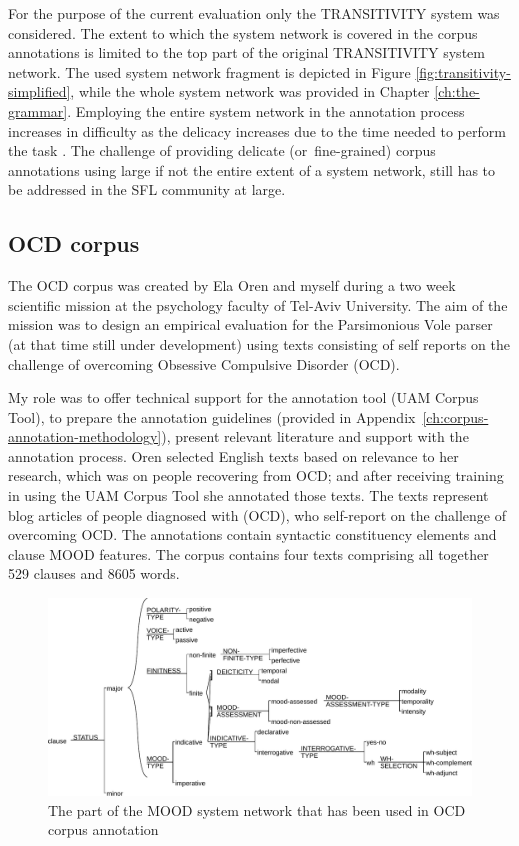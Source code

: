     For the purpose of the current evaluation only the TRANSITIVITY system was considered. The extent to which the system network is covered in the corpus annotations is limited to the top part of the original TRANSITIVITY system network. The used system network fragment is depicted in Figure \ref{fig:transitivity-simplified}, while the whole system network was provided in Chapter \ref{ch:the-grammar}. Employing the entire system network in the annotation process increases in difficulty as the delicacy increases due to the time needed to perform the task \citep[33]{mcenery2006corpus}. The challenge of providing delicate \mbox{(or fine-grained)} corpus annotations using large if not the entire extent of a system network, still has to be addressed in the SFL community at large. 

\subsection{OCD corpus}

     The OCD corpus was created by Ela Oren and myself during a two week scientific mission at the psychology faculty of Tel-Aviv University. The aim of the mission was to design an empirical evaluation for the Parsimonious Vole parser (at that time still under development) using texts consisting of self reports on the challenge of overcoming Obsessive Compulsive Disorder (OCD).
     
     My role was to offer technical support for the annotation tool (UAM Corpus Tool), to prepare the annotation guidelines (provided in \mbox{Appendix \ref{ch:corpus-annotation-methodology}}), present relevant literature and support with the annotation process. Oren selected English texts based on relevance to her research, which was on people recovering from OCD; and after receiving training in using the UAM Corpus Tool she annotated those texts. The texts represent blog articles of people diagnosed with (OCD), who self-report on the challenge of overcoming OCD. The annotations contain syntactic constituency elements and clause MOOD features. The corpus contains four texts comprising all together 529 clauses and 8605 words. 

    \begin{figure}[!h]
        \centering
        \includegraphics[width=.85\textwidth]{Figures/Evaluation/ocd1-mood-simplified.pdf}
        \caption{The part of the MOOD system network that has been used in OCD corpus annotation}
        \label{fig:mood-ocd-simplified}
    \end{figure}
    
